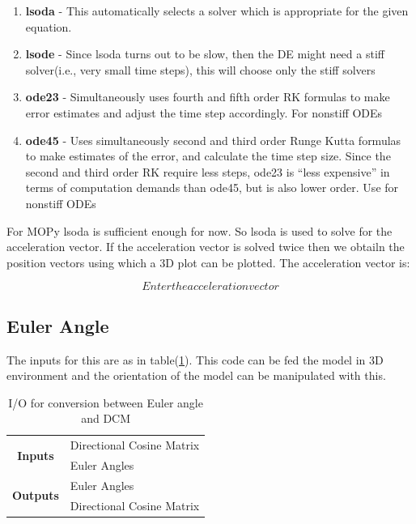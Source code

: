 \begin{enumerate}
\item \textbf{lsoda} - This automatically selects a solver which is appropriate for the given equation.
\item \textbf{lsode} - Since lsoda turns out to be slow, then the DE might need a stiff solver(i.e., very small time steps), this will choose only the stiff solvers 
\item \textbf{ode23} -  Simultaneously uses fourth and fifth order RK formulas to make error estimates and adjust the
time step accordingly. For nonstiff ODEs
\item \textbf{ode45} - Uses simultaneously second and third order Runge Kutta formulas to make estimates of the
error, and calculate the time step size. Since the second and third order RK require less steps, ode23 is
“less expensive” in terms of computation demands than ode45, but is also lower order. Use for nonstiff
ODEs
\end{enumerate}
For MOPy lsoda is sufficient enough for now. So lsoda is used to solve for the acceleration vector. If the acceleration vector is solved twice then we obtailn the position vectors using which a 3D plot can be plotted. The acceleration vector is: 

$$Enter the acceleration vector$$

\subsection{Euler Angle}

The inputs for this are as in table(\ref{eadcm}). This code can be fed the model in 3D environment and the orientation of the model can be manipulated with this.
\begin{table}[H]
\centering
\begin{tabular}{@{}cl@{}}
\toprule
\multirow{2}{*}{\textbf{Inputs}}                      & Directional Cosine Matrix \\ \cmidrule(l){2-2} 
                                             & Euler Angles              \\ \midrule
\multicolumn{1}{r}{\multirow{2}{*}{\textbf{Outputs}}} & Euler Angles              \\ \cmidrule(l){2-2} 
\multicolumn{1}{r}{}                         & Directional Cosine Matrix \\ \bottomrule
\end{tabular}
\caption{I/O for conversion between Euler angle and DCM}
\label{eadcm}
\end{table}
